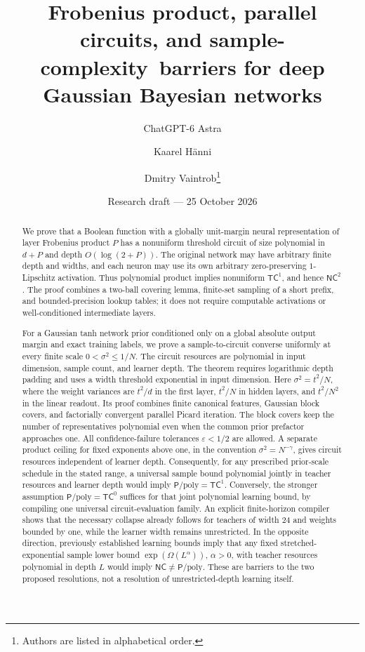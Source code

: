 \documentclass[11pt]{article}
\title{Frobenius product, parallel circuits, and sample-complexity\
barriers for deep Gaussian Bayesian networks}
\author{ChatGPT-6 Astra \and Kaarel H\"anni \and Dmitry Vaintrob\thanks{Authors are listed in alphabetical order.}}
\date{Research draft --- 25 October 2026}
\theoremstyle{remark}
\newcommand{\TC}{\mathsf{TC}}
\newcommand{\NC}{\mathsf{NC}}
\newcommand{\Ppoly}{\mathsf{P}/\mathrm{poly}}
\begin{document}
\maketitle
\begin{abstract}
We prove that a Boolean function with a globally unit-margin neural
representation of layer Frobenius product $P$ has a nonuniform threshold
circuit of size polynomial in $d+P$ and depth $O(\log(2+P))$. The original
network may have arbitrary finite depth and widths, and each neuron may
use its own arbitrary zero-preserving $1$-Lipschitz activation. Thus
polynomial product implies nonuniform $\TC^1$, and hence $\NC^2$.
The proof combines a two-ball covering lemma, finite-set sampling of a
short prefix, and bounded-precision lookup tables; it does not require
computable activations or well-conditioned intermediate layers.

For a Gaussian tanh network prior conditioned only on a global
absolute output margin and exact training labels, we prove a sample-to-circuit
converse uniformly at every finite scale $0<\sigma^2\le1/N$.
The circuit resources are polynomial in input dimension, sample count,
and learner depth. The theorem requires logarithmic depth padding
and uses a width threshold exponential in input dimension.
Here $\sigma^2=t^2/N$, where the weight variances are $t^2/d$ in the
first layer, $t^2/N$ in hidden layers, and $t^2/N^2$ in the linear readout.
Its proof combines finite canonical features, Gaussian block covers,
and factorially convergent parallel Picard iteration. The block covers
keep the number of representatives polynomial even when the common
prior prefactor approaches one. All confidence-failure tolerances
$\varepsilon<1/2$ are allowed. A separate product ceiling for fixed exponents above one, in the
convention $\sigma^2=N^{-\gamma}$, gives circuit resources independent
of learner depth.
Consequently, for any prescribed prior-scale schedule in the stated
range, a universal sample bound polynomial jointly in teacher
resources and learner depth would imply
$\Ppoly=\TC^1$. Conversely, the stronger assumption
$\Ppoly=\TC^0$ suffices for that joint polynomial learning bound,
by compiling one universal circuit-evaluation family.
An explicit finite-horizon compiler shows that the necessary collapse
already follows for teachers of width $24$ and weights bounded by one,
while the learner width remains unrestricted.
In the opposite direction, previously established
learning bounds imply that any fixed stretched-exponential sample lower bound
$\exp(\Omega(L^\alpha))$, $\alpha>0$,
with teacher resources polynomial in depth $L$ would imply
$\NC\ne\Ppoly$. These are barriers to the two proposed resolutions,
not a resolution of unrestricted-depth learning itself.
\end{abstract}
\end{document}
